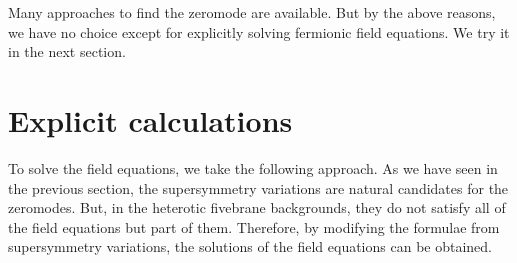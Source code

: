 \documentclass[a4paper,aps, amssymb, preprint, 12pt]{revtex4}
\begin{document}
Many approaches to find the zeromode are available.
But by the above reasons, we have no choice except for explicitly solving fermionic field equations.
We try it in the next section.


\section{Explicit calculations}
\label{sec:four}
To solve the field equations, we take the following approach.
As we have seen in the previous section, the supersymmetry variations are natural candidates for the zeromodes.
But, in the heterotic fivebrane backgrounds, they do not satisfy all of the field equations but part of them.
Therefore, by modifying the formulae from supersymmetry variations, the solutions of the field equations can be obtained.
\end{document}
